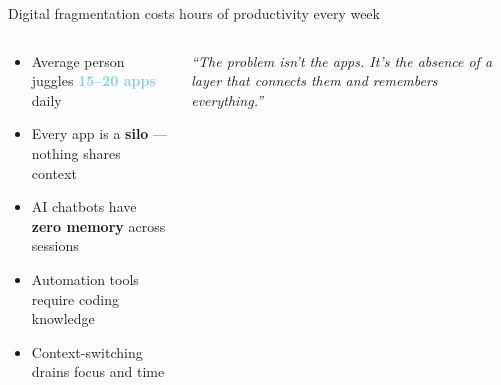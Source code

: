 \documentclass[aspectratio=169, 10pt]{beamer}
\newcommand{\hl}[1]{\textcolor{skyblue}{\textbf{#1}}}
\begin{document}
\begin{frame}{Digital fragmentation costs hours of productivity every week}
  \begin{columns}[T]
      \begin{tcolorbox}[redcard, title={\faExclamationTriangle\; The Fragmented Reality}]
        \small
        \begin{itemize}\setlength\itemsep{3pt}
          \item Average person juggles \hl{15–20 apps} daily
          \item Every app is a \textbf{silo} — nothing shares context
          \item AI chatbots have \textbf{zero memory} across sessions
          \item Automation tools require coding knowledge
          \item Context-switching drains focus and time
        \end{itemize}
      \end{tcolorbox}
      \vspace{5pt}
      \begin{tcolorbox}[card]
        \small\color{dimcol}\itshape
        ``The problem isn't the apps. It's the absence of a layer that connects them and remembers everything.''
      \end{tcolorbox}

      \centering\vspace{0.5em}

  \end{columns}
\end{frame}
\end{document}
